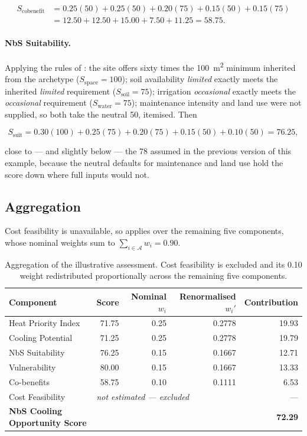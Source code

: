 \begin{align*}
S_{\mathrm{cobenefit}}
&= 0.25(50) + 0.25(50) + 0.20(75) + 0.15(50) + 0.15(75) \\
&= 12.50 + 12.50 + 15.00 + 7.50 + 11.25 = \mathbf{58.75}.
\end{align*}

\paragraph{NbS Suitability.} Applying the rules of
: the site offers sixty times the
\qty{100}{\metre\squared} minimum inherited from the archetype
($S_{\mathrm{space}} = 100$); soil availability \emph{limited} exactly meets the
inherited \emph{limited} requirement ($S_{\mathrm{soil}} = 75$); irrigation
\emph{occasional} exactly meets the \emph{occasional} requirement
($S_{\mathrm{water}} = 75$);
maintenance intensity and land use were not supplied, so both take the neutral
50, itemised. Then

\[
S_{\mathrm{suit}} = 0.30(100) + 0.25(75) + 0.20(75) + 0.15(50) + 0.10(50)
                   = \mathbf{76.25},
\]

close to --- and slightly below --- the 78 assumed in the previous version of
this example, because the neutral defaults for maintenance and land use hold
the score down where full inputs would not.

\subsection{Aggregation}

Cost feasibility is unavailable, so  applies
over the remaining five components, whose nominal weights sum to
$\sum_{i \in \mathcal{A}} w_i = 0.90$.

\begin{table}[H]
\centering
\caption[Worked example aggregation]{Aggregation of the illustrative
assessment. Cost feasibility is excluded and its \num{0.10} weight
redistributed proportionally across the remaining five components.}
\label{tab:we-aggregation}
\small
\begin{tabular}{@{}lrrrr@{}}
\toprule
\textbf{Component} & \textbf{Score} & \textbf{Nominal $w_i$} &
\textbf{Renormalised $w_i'$} & \textbf{Contribution} \\
\midrule
Heat Priority Index  & 71.75 & 0.25 & 0.2778 & 19.93 \\
Cooling Potential    & 71.25 & 0.25 & 0.2778 & 19.79 \\
NbS Suitability      & 76.25 & 0.15 & 0.1667 & 12.71 \\
Vulnerability        & 80.00 & 0.15 & 0.1667 & 13.33 \\
Co-benefits          & 58.75 & 0.10 & 0.1111 &  6.53 \\
Cost Feasibility     & \multicolumn{3}{l}{\emph{not estimated --- excluded}} & --- \\
\midrule
\textbf{NbS Cooling Opportunity Score} & & & & \textbf{72.29} \\
\bottomrule
\end{tabular}
\end{table}

